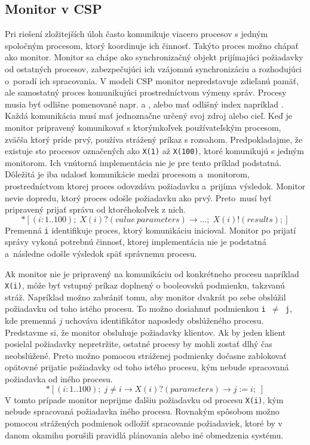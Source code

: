 \documentclass[
  biblatex,
  seconds=true,
  language=slovak,
  figures=false,
  urldate=iso,
  glossaries,
  index
]{kidiplom}
\begin{document}
\subsection{Monitor v CSP}
Pri riešení zložitejších úloh často komunikuje viacero procesov s jedným spoločným procesom, ktorý koordinuje ich činnosť. Takýto proces možno chápať ako monitor. Monitor sa chápe ako synchronizačný objekt prijímajúci požiadavky od ostatných procesov, zabezpečujúci ich vzájomnú synchronizáciu a rozhodujúci o~poradí ich spracovania. V modeli CSP monitor nepredstavuje zdieľanú pamäť, ale samostatný proces komunikujúci prostredníctvom výmeny správ.
Procesy musia byť odlišne pomenované napr.  a ,
alebo mať odlišný index napríklad . Každá komunikácia musí mať jednoznačne určený svoj zdroj alebo cieľ. Keď je monitor pripravený komunikovať
s ktorýmkoľvek používateľským procesom, zväčša ktorý príde prvý, používa strážený príkaz s rozsahom.
Predpokladajme, že existuje sto procesov označených ako \texttt{X(1)} až \texttt{X(100)}, ktoré komunikujú s jedným monitorom. Ich vnútorná implementácia nie je pre tento príklad podstatná. Dôležitá je iba udalosť komunikácie medzi procesom a~monitorom, prostredníctvom ktorej proces odovzdáva požiadavku a~prijíma výsledok. Monitor nevie dopredu, ktorý proces odošle požiadavku ako prvý. 
Preto~musí byť pripravený prijať správu od ktoréhokoľvek z nich.
\[
	*[(i:1..100);\; X(i)?(value\ parameters) \rightarrow \dots ;\; X(i)!(results);]
\]
Premenná \texttt{i} identifikuje proces, ktorý komunikáciu inicioval. Monitor po prijatí správy vykoná potrebnú činnosť, ktorej implementácia nie je podstatná a~následne odošle výsledok späť správnemu procesu.

Ak monitor nie je pripravený na komunikáciu od konkrétneho procesu napríklad \texttt{X(i)}, môže byť vstupný príkaz doplnený o booleovskú podmienku,
takzvanú stráž. Napríklad možno zabrániť tomu, aby monitor dvakrát po sebe obslúžil požiadavku od toho istého procesu. To možno dosiahnuť podmienkou \texttt{i $\neq$ j}, kde premenná $j$ uchováva identifikátor naposledy obslúženého procesu.
Predstavme si, že monitor obsluhuje požiadavky klientov. Ak by jeden klient posielal požiadavky nepretržite, ostatné procesy by mohli zostať dlhý čas neobslúžené. Preto možno pomocou stráženej podmienky dočasne zablokovať opätovné prijatie požiadavky od toho istého procesu, kým nebude spracovaná požiadavka od iného procesu.
\[
	*[(i:1..100);\; j\neq i \rightarrow X(i)?(parameters) \rightarrow j := i ;\;]
\]
V tomto prípade monitor neprijme ďalšiu požiadavku od procesu \texttt{X(i)}, kým nebude spracovaná požiadavka iného procesu.
Rovnakým spôsobom možno pomocou strážených podmienok odložiť spracovanie požiadaviek, ktoré by v danom okamihu porušili pravidlá plánovania alebo iné obmedzenia systému.
\end{document}
